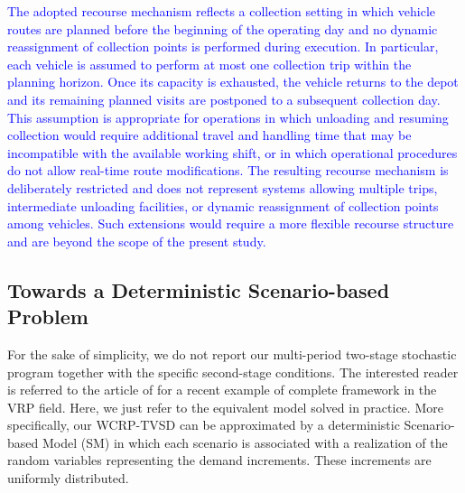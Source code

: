 \documentclass[authoryear,preprint,12pt]{elsarticle}
\newcommand{\rev}[1]{\textcolor{blue}{{#1}}}
\begin{document}
\rev{The adopted recourse mechanism reflects a collection setting in which vehicle routes are planned before the beginning of the operating day and no dynamic reassignment of collection points is performed during execution. In particular, each vehicle is assumed to perform at most one collection trip within the planning horizon. Once its capacity is exhausted, the vehicle returns to the depot and its remaining planned visits are postponed to a subsequent collection day. This assumption is appropriate for operations in which unloading and resuming collection would require additional travel and handling time that may be incompatible with the available working shift, or in which operational procedures do not allow real-time route modifications. The resulting recourse mechanism is deliberately restricted and does not represent systems allowing multiple trips, intermediate unloading facilities, or dynamic reassignment of collection points among vehicles. Such extensions would require a more flexible recourse structure and are beyond the scope of the present study.}





\subsection{Towards a Deterministic Scenario-based Problem}
For the sake of simplicity, we do not report our multi-period two-stage stochastic program together with the specific second-stage conditions. The interested reader is referred to the article of \cite{Gobbi2026} for a recent example of complete framework in the VRP field. Here, we just refer to the equivalent model solved in practice. More specifically, our WCRP-TVSD can be approximated
by a deterministic Scenario-based
Model (SM) in which each
scenario is associated with a realization of the random variables representing the demand increments. These increments are uniformly distributed.
\end{document}
